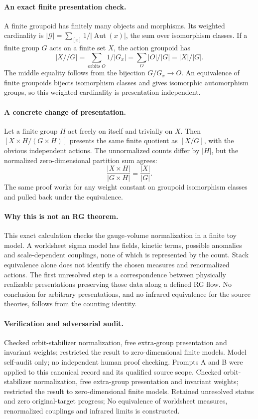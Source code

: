 \documentclass[11pt]{article}
\begin{document}
\paragraph{An exact finite presentation check.} A finite groupoid has finitely many objects and morphisms. Its weighted cardinality is $|\mathcal G|=\sum_{[x]}1/|\operatorname{Aut}(x)|$, the sum over isomorphism classes. If a finite group $G$ acts on a finite set $X$, the action groupoid has
\[
 |X//G|=\sum_{\text{orbits }O}1/|G_x|
 =\sum_O|O|/|G|=|X|/|G|.
\]
The middle equality follows from the bijection $G/G_x\to O$. An equivalence of finite groupoids bijects isomorphism classes and gives isomorphic automorphism groups, so this weighted cardinality is presentation independent.

\paragraph{A concrete change of presentation.} Let a finite group $H$ act freely on itself and trivially on $X$. Then $[X\times H/(G\times H)]$ presents the same finite quotient as $[X/G]$, with the obvious independent actions. The unnormalized counts differ by $|H|$, but the normalized zero-dimensional partition sum agrees:
\[
 \frac{|X\times H|}{|G\times H|}=\frac{|X|}{|G|}.
\]
The same proof works for any weight constant on groupoid isomorphism classes and pulled back under the equivalence.

\paragraph{Why this is not an RG theorem.} This exact calculation checks the gauge-volume normalization in a finite toy model. A worldsheet sigma model has fields, kinetic terms, possible anomalies and scale-dependent couplings, none of which is represented by the count. Stack equivalence alone does not identify the chosen measures and renormalized actions. The first unresolved step is a correspondence between physically realizable presentations preserving those data along a defined RG flow. No conclusion for arbitrary presentations, and no infrared equivalence for the source theories, follows from the counting identity.

\paragraph{Verification and adversarial audit.}
Checked orbit-stabilizer normalization, free extra-group presentation and invariant weights; restricted the result to zero-dimensional finite models. Model self-audit only; no independent human proof checking. Prompts A and B were applied to this canonical record and its qualified source scope. Checked orbit-stabilizer normalization, free extra-group presentation and invariant weights; restricted the result to zero-dimensional finite models. Retained unresolved status and zero original-target progress; No equivalence of worldsheet measures, renormalized couplings and infrared limits is constructed.
\end{document}
